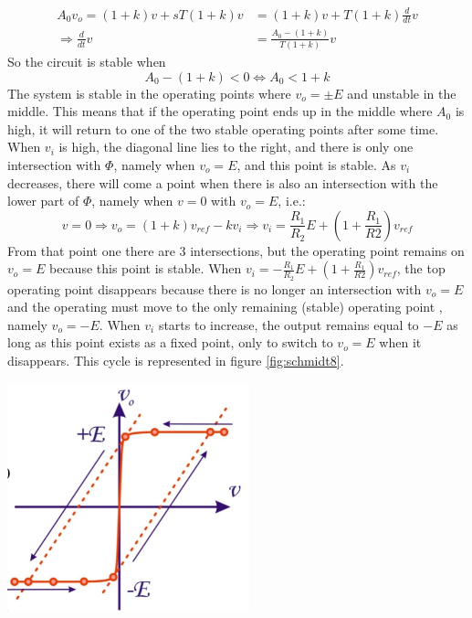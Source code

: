 \begin{align*}
	A_0 v_o = (1 + k)v + sT (1+k) v &= (1+k)v + T(1+k) \frac{d}{dt} v \\
	\Rightarrow \frac{d}{dt} v &= \frac{A_0 - (1+k)}{T(1+k)} v
\end{align*}
So the circuit is stable when 
$$A_0 - (1+k) < 0 \Leftrightarrow A_0 < 1 + k$$
The system is stable in the operating points where $v_o = \pm E$ and unstable in the middle. This means that if the operating point ends up in the middle where $A_0$ is high, it will return to one of the two stable operating points after some time.\\
When $v_i$ is high, the diagonal line lies to the right, and there is only one intersection with $\Phi$, namely when $v_o = E$, and this point is stable. As $v_i$ decreases, there will come a point when there is also an intersection with the lower part of $\Phi$, namely when $v = 0$ with $v_o = E$, i.e.:
$$v = 0 \Rightarrow v_o = (1+k)v_{ref} - kv_i \Rightarrow v_i = \frac{R_1}{R_2} E + (1 + \frac{R_1}{R2}) v_{ref}$$
From that point one there are $3$ intersections, but the operating point remains on $v_o = E$ because this point is stable. When $v_i = -\frac{R_1}{R_2} E + (1 + \frac{R_1}{R2}) v_{ref}$, the top operating point disappears because there is no longer an intersection with $v_o = E$ and the operating must move to the only remaining (stable) operating point , namely $v_o = -E$. When $v_i$ starts to increase, the output remains equal to $-E$ as long as this point exists as a fixed point, only to switch to $v_o = E$ when it disappears. This cycle is represented in figure \ref{fig:schmidt8}.\\
\begin{minipage}{.5\textwidth}
	\centering
	\includegraphics[width=7cm]{figures/ch15/schmidt8.jpg}
	\label{fig:schmidt8}
\end{minipage}%
